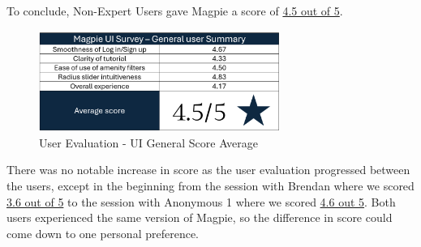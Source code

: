 \newpage{}

To conclude, Non-Expert Users gave Magpie a score of \underline{4.5 out of 5}.
\begin{figure}[h!]
  \centering
  \includegraphics[width=0.7\textwidth]{images/survey-casual-summary.png}
  \caption{User Evaluation - UI General Score Average}
\end{figure}

There was no notable increase in score as the user evaluation progressed between
the users, except in the beginning from the session with Brendan where we scored
\underline{3.6 out of 5} to the session with Anonymous 1 where we scored
\underline{4.6 out 5}. Both users experienced the same version of Magpie, so the
difference in score could come down to one personal preference.